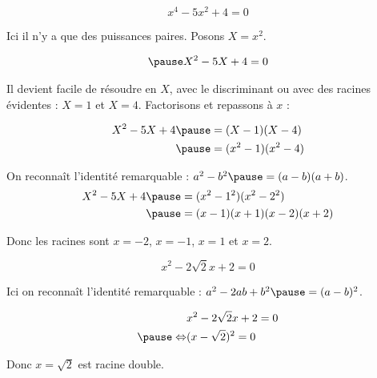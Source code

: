 \documentclass[9pt,professionalfonts,handout,hyperref]{beamer}
\begin{document}
\begin{frame}

$$x^4-5x^2+4 = 0$$

\pause Ici il n'y a que des puissances paires. \pause Posons $X = x^2$.

\[\begin{aligned}
\pause X^2-5X+4 = 0
\end{aligned}\]

\pause Il devient facile de résoudre en $X$, avec le discriminant ou avec des racines évidentes : \pause $X=1$ et $X=4$.\newline
\pause Factorisons et repassons à $x$ :

\[\begin{aligned}
X^2-5X+4
\pause &= (X-1)(X-4) \\
\pause &= (x^2-1)(x^2-4) \\
\end{aligned}\]

On reconnaît l'identité remarquable : \pause $a^2-b^2 \pause = (a-b)(a+b)$.\\

\[\begin{aligned}
X^2-5X+4
\pause &= (x^2-1^2)(x^2-2^2) \\
\pause &= (x-1)(x+1)(x-2)(x+2) \\
\end{aligned}\]

\pause Donc les racines sont $x = -2$, $x = -1$, $x = 1$ et $x = 2$.

\end{frame}

\begin{frame}

$$x^2 - 2\sqrt{2}x + 2 = 0$$

\bigskip

\pause Ici on reconnaît l'identité remarquable : \pause $a^2 -2ab +b^2 \pause = (a-b)^2$.

\[\begin{aligned}
&x^2 - 2\sqrt{2}x + 2  = 0\\
\pause \Leftrightarrow&(x -\sqrt{2})^2 = 0
\end{aligned}\]

\pause Donc $x = \sqrt{2}$ est racine double.
\end{frame}

%
%
\end{document}
